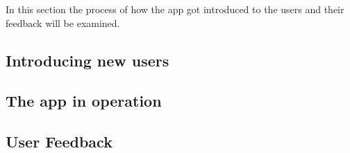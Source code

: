 \Author{\daAuthorTwo}

In this section the process of how the app got introduced to the users and their feedback will be examined.

\blankLine

\subsection{Introducing new users}

\subsection{The app in operation}

\subsection{User Feedback}

\newpage
